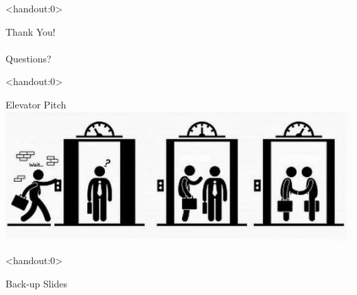\documentclass[xcolor=svgnames,aspectratio=32,8pt]{beamer}
\begin{document}


%   
%   




\begin{frame}<handout:0>
  {}{}
  \begin{changemargin}{-1cm}{-1cm}
  \centering
  {\Huge \color{evolvdso}Thank You! \smiley{}\\\ \\Questions? \frownie{}}
  \end{changemargin}
\end{frame}



\begin{frame}<handout:0>
  {}{}
  \begin{changemargin}{-1cm}{-1cm}
  \centering
  {\Huge \color{evolvdso}Elevator Pitch}\\
  \vspace{0.3cm}
  \includegraphics[width=0.6\paperwidth]{OtherImages/ElevatorPitch.jpg}
  \end{changemargin}
\end{frame}



\begin{frame}<handout:0>
  {}{}
  \begin{changemargin}{-1cm}{-1cm}
  \centering
  {\Huge \color{evolvdso}Back-up Slides}
  \end{changemargin}
\end{frame}
\end{document}
